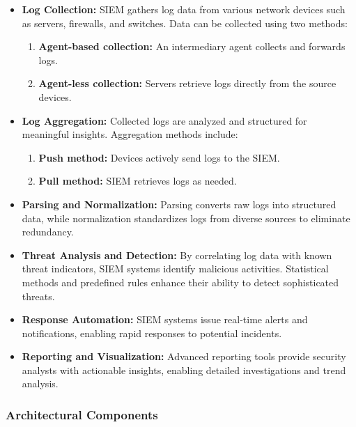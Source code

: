 \begin{itemize}
    \item \textbf{Log Collection:} SIEM gathers log data from various network devices such as servers, firewalls, and switches. Data can be collected using two methods:
    \begin{enumerate}
        \item \textbf{Agent-based collection:} An intermediary agent collects and forwards logs.
        \item \textbf{Agent-less collection:} Servers retrieve logs directly from the source devices.
    \end{enumerate}
    
    \item \textbf{Log Aggregation:} Collected logs are analyzed and structured for meaningful insights. Aggregation methods include:
    \begin{enumerate}
        \item \textbf{Push method:} Devices actively send logs to the SIEM.
        \item \textbf{Pull method:} SIEM retrieves logs as needed.
    \end{enumerate}
    
    \item \textbf{Parsing and Normalization:} Parsing converts raw logs into structured data, while normalization standardizes logs from diverse sources to eliminate redundancy.
    
    \item \textbf{Threat Analysis and Detection:} By correlating log data with known threat indicators, SIEM systems identify malicious activities. Statistical methods and predefined rules enhance their ability to detect sophisticated threats.
    
    \item \textbf{Response Automation:} SIEM systems issue real-time alerts and notifications, enabling rapid responses to potential incidents.
    
    \item \textbf{Reporting and Visualization:} Advanced reporting tools provide security analysts with actionable insights, enabling detailed investigations and trend analysis.
\end{itemize}

\subsubsection{Architectural Components}

